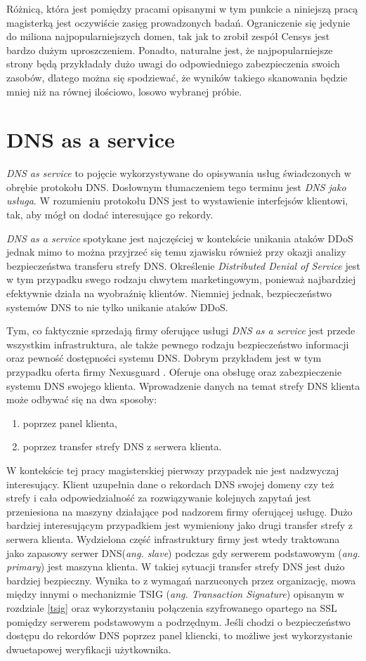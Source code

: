 Różnicą, która jest pomiędzy pracami opisanymi w tym punkcie a niniejszą pracą magisterką jest oczywiście zasięg prowadzonych badań.
Ograniczenie się jedynie do miliona najpopularniejszych domen, tak jak to zrobił zespół Censys \cite{censys} jest bardzo dużym
uproszczeniem. Ponadto, naturalne jest, że najpopularniejsze strony będą przykładały dużo uwagi do odpowiedniego zabezpieczenia
swoich zasobów, dlatego można się spodziewać, że wyników takiego skanowania będzie mniej niż na równej ilościowo, losowo wybranej próbie.

\section{DNS as a service}
\textit{DNS as service} to pojęcie wykorzystywane do opisywania usług świadczonych w obrębie protokołu DNS. Dosłownym tłumaczeniem tego
terminu jest \textit{DNS jako usługa}. W rozumieniu protokołu DNS jest to wystawienie interfejsów klientowi, tak,
aby mógł on dodać interesujące go rekordy.

\textit{DNS as a service} spotykane jest najczęściej w kontekście unikania ataków DDoS jednak mimo to można przyjrzeć się temu
zjawisku również przy okazji analizy bezpieczeństwa transferu strefy DNS. Określenie \textit{Distributed Denial of Service} jest w
tym przypadku swego rodzaju chwytem marketingowym, ponieważ najbardziej efektywnie działa na wyobraźnię klientów. Niemniej jednak,
bezpieczeństwo systemów DNS to nie tylko unikanie ataków DDoS.

Tym, co faktycznie sprzedają firmy oferujące usługi \textit{DNS as a service} jest przede wszystkim infrastruktura, ale także
pewnego rodzaju bezpieczeństwo informacji oraz pewność dostępności systemu DNS. Dobrym przykładem jest w tym przypadku oferta firmy
Nexusguard \cite{nexusguard}. Oferuje ona obsługę oraz zabezpieczenie systemu DNS swojego klienta. Wprowadzenie danych na temat strefy
DNS klienta może odbywać się na dwa sposoby:
\begin{enumerate}
	\item poprzez panel klienta,
	\item poprzez transfer strefy DNS z serwera klienta.
\end{enumerate}
W kontekście tej pracy magisterskiej pierwszy przypadek nie jest nadzwyczaj interesujący. Klient uzupełnia dane o rekordach DNS
swojej domeny czy też strefy i cała odpowiedzialność za rozwiązywanie kolejnych zapytań jest przeniesiona na maszyny działające
pod nadzorem firmy oferującej usługę. Dużo bardziej interesującym przypadkiem jest wymieniony jako drugi transfer strefy z serwera
klienta. Wydzielona część infrastruktury firmy jest wtedy traktowana jako zapasowy serwer DNS(\textit{ang. slave}) podczas gdy
serwerem podstawowym (\textit{ang. primary}) jest maszyna klienta. W takiej sytuacji transfer strefy DNS jest dużo bardziej bezpieczny. Wynika to
z wymagań narzuconych przez organizację, mowa między innymi o mechanizmie TSIG (\textit{ang. Transaction Signature})  opisanym w
rozdziale \ref{tsig} oraz wykorzystaniu połączenia szyfrowanego opartego na SSL pomiędzy serwerem podstawowym a podrzędnym. Jeśli
chodzi o bezpieczeństwo dostępu do rekordów DNS poprzez panel kliencki, to możliwe jest wykorzystanie dwuetapowej weryfikacji użytkownika.

